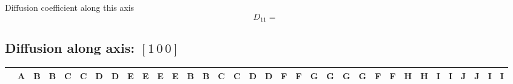\documentclass[a4paper, 11pt]{article}
\begin{document}
\normalsize
Diffusion coefficient along this axis\\
		\begin{equation*}
			D_{11} = 
		\end{equation*}

\subsection{Diffusion along axis: $\left[		1 		\, 0 		\, 0 \right]$}

\clearpage
\begin{landscape}

\footnotesize
\renewcommand{\arraystretch}{1.8}
\begin{table}[htpb]
	\begin{tabularx}{\linewidth}{ p{15pt} | >{\raggedright\arraybackslash}X  >{\raggedright\arraybackslash}X  >{\raggedright\arraybackslash}X  >{\raggedright\arraybackslash}X  >{\raggedright\arraybackslash}X  >{\raggedright\arraybackslash}X  >{\raggedright\arraybackslash}X  >{\raggedright\arraybackslash}X  >{\raggedright\arraybackslash}X  >{\raggedright\arraybackslash}X  >{\raggedright\arraybackslash}X  >{\raggedright\arraybackslash}X  >{\raggedright\arraybackslash}X  >{\raggedright\arraybackslash}X  >{\raggedright\arraybackslash}X  >{\raggedright\arraybackslash}X  >{\raggedright\arraybackslash}X  >{\raggedright\arraybackslash}X  >{\raggedright\arraybackslash}X  >{\raggedright\arraybackslash}X  >{\raggedright\arraybackslash}X  >{\raggedright\arraybackslash}X  >{\raggedright\arraybackslash}X  >{\raggedright\arraybackslash}X  >{\raggedright\arraybackslash}X  >{\raggedright\arraybackslash}X  >{\raggedright\arraybackslash}X  >{\raggedright\arraybackslash}X  >{\raggedright\arraybackslash}X  >{\raggedright\arraybackslash}X  >{\raggedright\arraybackslash}X  >{\raggedright\arraybackslash}X  >{\raggedright\arraybackslash}X }
		\toprule
   &  A &  B &  B &  C &  C &  D &  D &  E &  E &  E &  E &  B &  B &  C &  C &  D &  D &  F &  F &  G &  G &  G &  G &  F &  F &  H &  H &  I &  I &  J &  J &  I &  I\\ \midrule


\end{tabularx}
\end{table}
\end{landscape}
\end{document}
